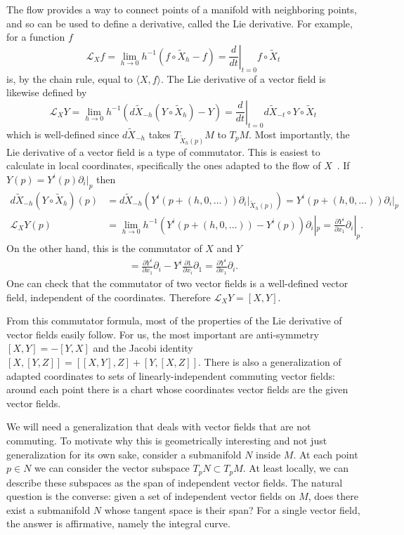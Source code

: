 The flow provides a way to connect points of a manifold with neighboring points, and so can be used to define a derivative, called the Lie derivative.
For example, for a function $f$
\[
\mathcal{L}_X f
= \lim_{h \to 0} h^{-1} \left( f \circ \tilde{X}_h - f \right)
= \left.\frac{d}{dt}\right|_{t=0} f \circ \tilde{X}_t
\]
is, by the chain rule, equal to $\langle X, f\rangle$.
The Lie derivative of a vector field is likewise defined by
\[
\mathcal{L}_X Y
= \lim_{h \to 0} h^{-1} \left( d\tilde{X}_{-h}(Y \circ \tilde{X}_h) - Y \right)
= \left.\frac{d}{dt}\right|_{t=0} d\tilde{X}_{-t} \circ Y \circ \tilde{X}_t
\]
which is well-defined since $d\tilde{X}_{-h}$ takes $T_{\tilde{X}_h(p)}M$ to $T_pM$.
Most importantly, the Lie derivative of a vector field is a type of commutator.
This is easiest to calculate in local coordinates, specifically the ones adapted to the flow of $X$~\cite[Thm~9.38]{Lee2012}.
If $Y(p) = Y^i(p) \partial_i|_p$ then
\begin{align*}
d\tilde{X}_{-h}(Y \circ \tilde{X}_h) (p)
&= d\tilde{X}_{-h} \left( Y^i(p + (h,0,\ldots)) \partial_i|_{\tilde{X}_h(p)} \right)
= Y^i(p + (h,0,\ldots)) \partial_i|_{p} \\
\mathcal{L}_X Y (p)
&= \lim_{h \to 0} h^{-1} \left( Y^i(p + (h,0,\ldots)) - Y^i(p) \right) \partial_i|_{p}
= \frac{\partial Y^i}{\partial x_1} \partial_i|_{p}.
\end{align*}
On the other hand, this is the commutator of $X$ and $Y$
\begin{align*}
[X,Y]
= \frac{\partial Y^i}{\partial x_1} \partial_i - Y^i\frac{\partial 1}{\partial x_i} \partial_1
= \frac{\partial Y^i}{\partial x_1} \partial_i.
\end{align*}
One can check that the commutator of two vector fields is a well-defined vector field, independent of the coordinates.
Therefore $\mathcal{L}_X Y = [X,Y]$.

From this commutator formula, most of the properties of the Lie derivative of vector fields easily follow.
For us, the most important are anti-symmetry $[X,Y] = -[Y,X]$ and the Jacobi identity $[X,[Y,Z]] = [[X,Y],Z] + [Y, [X,Z]]$.
There is also a generalization of adapted coordinates to sets of linearly-independent commuting vector fields: around each point there is a chart whose coordinates vector fields are the given vector fields.

We will need a generalization that deals with vector fields that are not commuting.
To motivate why this is geometrically interesting and not just generalization for its own sake, consider a submanifold $N$ inside $M$.
At each point $p \in N$ we can consider the vector subspace $T_pN \subset T_pM$.
At least locally, we can describe these subspaces as the span of independent vector fields.
The natural question is the converse: given a set of independent vector fields on $M$, does there exist a submanifold $N$ whose tangent space is their span?
For a single vector field, the answer is affirmative, namely the integral curve.

